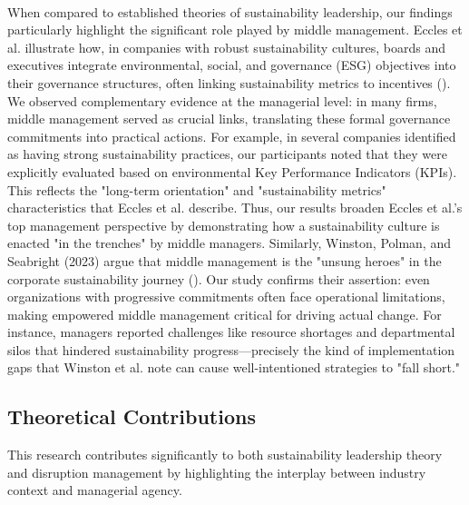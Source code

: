 	\paragraph*{} When compared to established theories of sustainability leadership, our findings particularly highlight the significant role played by middle management. Eccles et al. illustrate how, in companies with robust sustainability cultures, boards and executives integrate environmental, social, and governance (ESG) objectives into their governance structures, often linking sustainability metrics to incentives (\textcite{Eccles2014}). We observed complementary evidence at the managerial level: in many firms, middle management served as crucial links, translating these formal governance commitments into practical actions. For example, in several companies identified as having strong sustainability practices, our participants noted that they were explicitly evaluated based on environmental Key Performance Indicators (KPIs). This reflects the "long-term orientation" and "sustainability metrics" characteristics that Eccles et al. describe. Thus, our results broaden Eccles et al.’s top management perspective by demonstrating how a sustainability culture is enacted "in the trenches" by middle managers. Similarly, Winston, Polman, and Seabright (2023) argue that middle management is the "unsung heroes" in the corporate sustainability journey (\textcite{Winston2023}). Our study confirms their assertion: even organizations with progressive commitments often face operational limitations, making empowered middle management critical for driving actual change. For instance, managers reported challenges like resource shortages and departmental silos that hindered sustainability progress—precisely the kind of implementation gaps that Winston et al. note can cause well-intentioned strategies to "fall short."
	
	\subsection{Theoretical Contributions}
	This research contributes significantly to both sustainability leadership theory and disruption management by highlighting the interplay between industry context and managerial agency.
	
